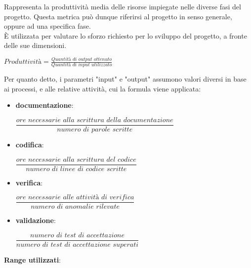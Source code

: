 Rappresenta la produttivit\`a media delle risorse impiegate nelle diverse fasi del progetto. Questa metrica pu\`o dunque riferirsi al progetto in senso generale, oppure ad una specifica fase.\\ \`E utilizzata per valutare lo sforzo richiesto per lo sviluppo del progetto, a fronte delle sue dimensioni.
\begin{center}
\begin{math}
	\textit{Produttivit\`a} = \frac	{\textit{Quantit\`a di output ottenuto}}
									{\textit{Quantit\`a di input utilizzato}}
\end{math}
\end{center}
Per quanto detto, i parametri "input" e "output" assumono valori diversi in base ai processi, e alle relative attivit\`a, cui la formula viene applicata:
\begin{itemize}
	\item \textbf{documentazione}:
	\begin{center} 
		\begin{math}
			\dfrac	{\textit{ore necessarie alla scrittura della documentazione}}
					{\textit{numero di parole scritte}}
		\end{math}
	\end{center}	
	\item \textbf{codifica}:
	\begin{center} 
		\begin{math}
			\dfrac	{\textit{ore necessarie alla scrittura del codice}}
					{\textit{numero di linee di codice scritte}}
		\end{math}
	\end{center}	
	\item \textbf{verifica}:
	\begin{center} 
		\begin{math}
			\dfrac	{\textit{ore necessarie alle attivit\`a di verifica}}
					{\textit{numero di anomalie rilevate}}
		\end{math}
	\end{center}		
	\item \textbf{validazione}: 
	\begin{center}
		\begin{math}
			\dfrac	{\textit{numero di test di accettazione}}
					{\textit{numero di test di accettazione superati}}
		\end{math}
	\end{center}		
\end{itemize}

\textbf{Range utilizzati}: \\

